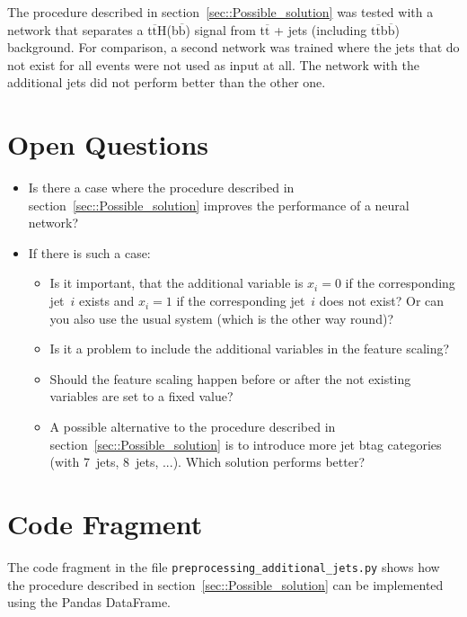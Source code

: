 \documentclass[12pt,a4paper]{article}
\begin{document}
The procedure described in section~\ref{sec::Possible_solution} was tested with a network that separates a t$\overline{\text{t}}$H(b$\overline{\text{b}}$) signal from t$\overline{\text{t}}$ + jets (including t$\overline{\text{t}}$b$\overline{\text{b}}$) background. For comparison, a second network was trained where the jets that do not exist for all events were not used as input at all. The network with the additional jets did not perform better than the other one.


\section{Open Questions}

\begin{itemize}
\item Is there a case where the procedure described in section~\ref{sec::Possible_solution} improves the performance of a neural network?
\item If there is such a case:
\begin{itemize}
\item Is it important, that the additional variable is $x_i = 0$ if the corresponding jet~$i$ exists and $x_i = 1$ if the corresponding jet~$i$ does not exist? Or can you also use the usual system (which is the other way round)?
\item Is it a problem to include the additional variables in the feature scaling?
\item Should the feature scaling happen before or after the not existing variables are set to a fixed value?
\item A possible alternative to the procedure described in section~\ref{sec::Possible_solution} is to introduce more jet btag categories (with 7~jets, 8~jets, ...). Which solution performs better?
\end{itemize}
\end{itemize}


\section{Code Fragment}

The code fragment in the file \texttt{preprocessing\_additional\_jets.py} shows how the procedure described in section~\ref{sec::Possible_solution} can be implemented using the Pandas DataFrame.
\end{document}
